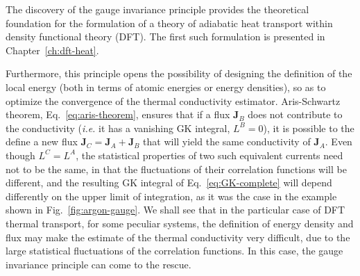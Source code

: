 \begin{LEtext}
The discovery of the gauge invariance principle provides the theoretical foundation for the formulation of a theory of adiabatic heat transport within density functional theory (DFT). The first such formulation is presented in Chapter~\ref{ch:dft-heat}. 

Furthermore, this principle opens the possibility of designing the definition of the local energy (both in terms of atomic energies or energy densities), so as to optimize the convergence of the thermal conductivity estimator.
Aris-Schwartz theorem, Eq.~\eqref{eq:aris-theorem}, ensures that if a flux $\mathbf{J}_B$ does not contribute to the conductivity (\emph{i.e.} it has a vanishing GK integral, $L^B=0$), it is possible to the define a new flux $\mathbf{J}_C=\mathbf{J}_A+\mathbf{J}_B$ that will yield the same conductivity of $\mathbf{J}_A$. Even though $L^C=L^A$, the statistical properties of two such equivalent currents need not to be the same, in that the fluctuations of their correlation functions will be different, and the resulting GK integral of Eq.~\eqref{eq:GK-complete} will depend differently on the upper limit of integration, as it was the case in the example shown in Fig.~\ref{fig:argon-gauge}.
We shall see that in the particular case of DFT thermal transport, for some peculiar systems, the definition of energy density and flux may make the estimate of the thermal conductivity very difficult, due to the large statistical fluctuations of the correlation functions. In this case, the gauge invariance principle can come to the rescue.
\end{LEtext}
